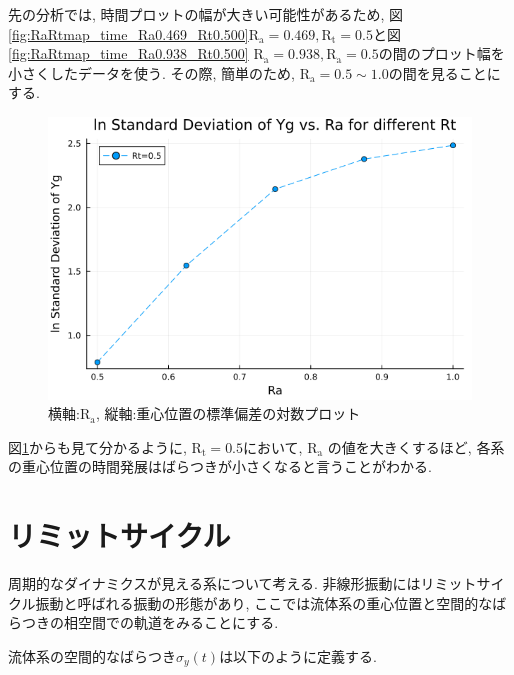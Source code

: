 \vspace{1\baselineskip}

先の分析では, 時間プロットの幅が大きい可能性があるため, 図\ref{fig:RaRtmap_time_Ra0.469_Rt0.500}$\text{R}_\text{a} = 0.469, \text{R}_\text{t} = 0.5$と図\ref{fig:RaRtmap_time_Ra0.938_Rt0.500} $\text{R}_\text{a} = 0.938, \text{R}_\text{a} = 0.5$の間のプロット幅を小さくしたデータを使う. その際, 簡単のため, $\text{R}_\text{a} =0.5 \sim 1.0$の間を見ることにする.



\begin{figure}[H]
  \centering
  \includegraphics[scale=0.5]{image/lnStdYg_Ra0.5to1.0_Rt0.5_ti25000.png}
  \caption{横軸:$\text{R}_\text{a}$, 縦軸:重心位置の標準偏差の対数プロット}
  \label{fig:lnStdYg_Ra0.5to1.0_Rt0.5_ti25000}
\end{figure}

図\ref{fig:lnStdYg_Ra0.5to1.0_Rt0.5_ti25000}からも見て分かるように, $\text{R}_\text{t} = 0.5$において, $\text{R}_\text{a}$ の値を大きくするほど, 各系の重心位置の時間発展はばらつきが小さくなると言うことがわかる.

\section{リミットサイクル}

周期的なダイナミクスが見える系について考える. 非線形振動にはリミットサイクル振動\cite{Rhythm}と呼ばれる振動の形態があり, ここでは流体系の重心位置と空間的なばらつきの相空間での軌道をみることにする.

流体系の空間的なばらつき$\sigma_{y} (t)$は以下のように定義する.

